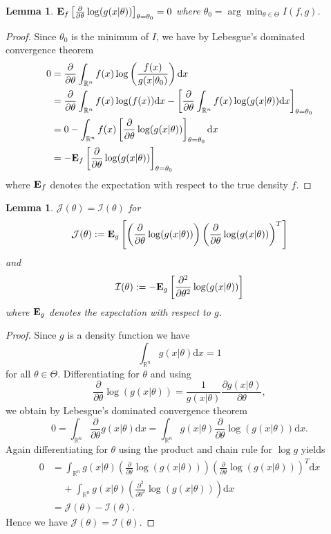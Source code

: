 \documentclass[a4paper, 12pt]{scrreprt}
\newtheorem{Lemma}[Theorem]{Lemma}
\newcommand{\RR}{\mathbb{R}}
\newcommand{\ew}{\mbox{\textbf{E}}}
\begin{document}
\begin{Lemma} \label{aic:lemma1} \upshape
$\ew_f \left[\frac{\partial}{\partial \theta} \log(g(x|\theta)) \right]_{\theta=\theta_0} = 0$ where $\theta_0 = \arg\min_{\theta \in \Theta} I(f,g)$.
\end{Lemma}
\begin{proof}
Since $\theta_0$ is the minimum of $I$, we have by Lebesgue's dominated convergence theorem
\begin{align*}
0 &=
\frac{\partial}{\partial \theta} \int_{\RR^n} f(x) \log\left( \frac{f(x)}{g(x|\theta_0)} \right)\mathrm{d}x \\
&= \frac{\partial}{\partial \theta} \int_{\RR^n} f(x) \log(f(x)) \mathrm{d}x
- \left[ \frac{\partial}{\partial \theta}  \int_{\RR^n} f(x) \log(g(x|\theta)) \mathrm{d}x \right]_{\theta = \theta_0} \\
&= 0 - \int_{\RR^n} f(x) \left[ \frac{\partial}{\partial \theta} \log (g(x|\theta)) \right]_{\theta = \theta_0} \mathrm{d}x \\
&= - \ew_f \left[\frac{\partial}{\partial \theta} \log(g(x|\theta)) \right]_{\theta=\theta_0}
\end{align*}
where $\ew_f$ denotes the expectation with respect to the true density $f$.
\end{proof}

\begin{Lemma}\label{aic:lemma2}\upshape $\mathcal{J}(\theta) = \mathcal{I}(\theta)$	
for  
\[ \mathcal{J}(\theta) :=  \ew_g\left[\left(\frac{\partial}{\partial \theta} \log(g(x|\theta)) \right) \left( \frac{\partial}{\partial \theta} \log(g(x|\theta)) \right)^T \right]
\]
and 
\[
\mathcal{I}(\theta) := - \ew_g\left[ \frac{\partial^2}{\partial \theta^2} \log(g(x|\theta)) \right]
\]
where $\ew_g$ denotes the expectation with respect to $g$.
\end{Lemma}
\begin{proof}
Since $g$ is a density function we have
\[ \int_{\RR^n} g(x|\theta) \mathrm{d}x =1 \] 
for all $\theta\in\Theta$.
Differentiating for $\theta$ and using 
\[ \frac{\partial}{\partial \theta} \log(g(x|\theta)) = \frac{1}{g(x|\theta)} \frac{\partial g(x|\theta) }{\partial \theta}, 
\]
we obtain by Lebesgue's dominated convergence theorem
\[
0 = \int_{\RR^n} \frac{\partial}{\partial \theta} g(x|\theta) \mathrm{d}x 
= \int_{\RR^n} g(x|\theta) \frac{\partial}{\partial \theta} \log(g(x|\theta)) \mathrm{d}x.
\]
Again differentiating for $\theta$ using the product and chain rule for $\log g$ yields
\begin{align*}
0 &= \int_{\RR^n} g(x|\theta) \left(\frac{\partial}{\partial \theta} \log(g(x|\theta)) \right) \left( \frac{\partial}{\partial \theta} \log(g(x|\theta)) \right)^T \mathrm{d}x \\
&\phantom{....} + \int_{\RR^n} g(x|\theta) \left( \frac{\partial^2}{\partial \theta^2} \log(g(x|\theta)) \right) \mathrm{d}x \\
&= \mathcal{J}(\theta) - \mathcal{I}(\theta).
\end{align*}
Hence we have $\mathcal{J}(\theta) = \mathcal{I}(\theta)$.
\end{proof}
\end{document}
